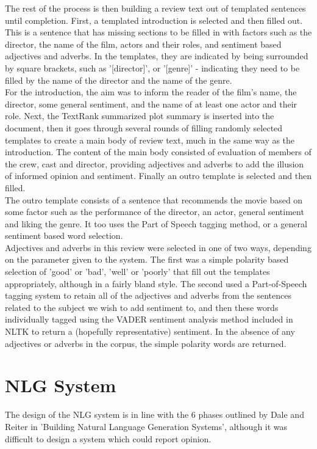 The rest of the process is then building a review text out of templated sentences until completion.
First, a templated introduction is selected and then filled out. This is a sentence that has missing sections to be filled in with factors such as the director, the name of the film, actors and their roles, and sentiment based adjectives and adverbs. In the templates, they are indicated by being surrounded by square brackets, such as '[director]', or '[genre]' - indicating they need to be filled by the name of the director and the name of the genre.\\ 
For the introduction, the aim was to inform the reader of the film's name, the director, some general sentiment, and the name of at least one actor and their role. Next, the TextRank summarized plot summary is inserted into the document, then it goes through several rounds of filling randomly selected templates to create a main body of review text, much in the same way as the introduction. The content of the main body consisted of evaluation of members of the crew, cast and director, providing adjectives and adverbs to add the illusion of informed opinion and sentiment. Finally an outro template is selected and then filled. \\
The outro template consists of a sentence that recommends the movie based on some factor such as the performance of the director, an actor, general sentiment and liking the genre. It too uses the Part of Speech tagging method, or a general sentiment based word selection.\\
Adjectives and adverbs in this review were selected in one of two ways, depending on the parameter given to the system. The first was a simple polarity based selection of 'good' or 'bad', 'well' or 'poorly' that fill out the templates appropriately, although in a fairly bland style. The second used a Part-of-Speech tagging system to retain all of the adjectives and adverbs from the sentences related to the subject we wish to add sentiment to, and then these words individually tagged using the VADER sentiment analysis method included in NLTK to return a (hopefully representative) sentiment. In the absence of any adjectives or adverbs in the corpus, the simple polarity words are returned.

\section{NLG System}
The design of the NLG system is in line with the 6 phases outlined by Dale and Reiter in 'Building Natural Language Generation Systems', although it was difficult to design a system which could report opinion.

